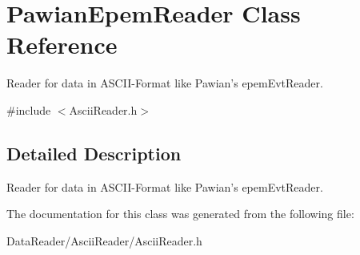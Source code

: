 \hypertarget{class_pawian_epem_reader}{\section{Pawian\-Epem\-Reader Class Reference}
\label{class_pawian_epem_reader}
}


Reader for data in A\-S\-C\-I\-I-\/\-Format like Pawian's epem\-Evt\-Reader.  




{\ttfamily \#include $<$Ascii\-Reader.\-h$>$}



\subsection{Detailed Description}
Reader for data in A\-S\-C\-I\-I-\/\-Format like Pawian's epem\-Evt\-Reader. 

The documentation for this class was generated from the following file\-:\begin{DoxyCompactItemize}
\item 
Data\-Reader/\-Ascii\-Reader/Ascii\-Reader.\-h\end{DoxyCompactItemize}
